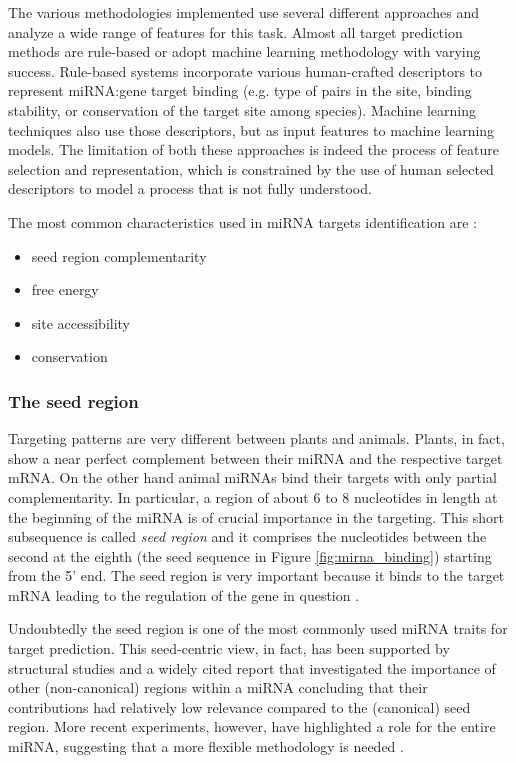 The various methodologies implemented use several different approaches and analyze a wide range of features for this task. Almost all target prediction methods are rule-based or adopt machine learning methodology with varying success. Rule-based systems incorporate various human-crafted descriptors to represent miRNA:gene target binding (e.g. type of pairs in the site, binding stability, or conservation of the target site among species). Machine learning techniques also use those descriptors, but as input features to machine learning models. The limitation of both these approaches is indeed the process of feature selection and representation, which is constrained by
the use of human selected descriptors to model a process that is not fully understood.

The most common characteristics used in miRNA targets identification are \cite{common_features}:
\begin{itemize}
	\item seed region complementarity
	\item free energy
	\item site accessibility
	\item conservation
\end{itemize}

\subsubsection{The seed region}
Targeting patterns are very different between plants and animals. Plants, in fact, show a near perfect complement between their miRNA and the respective target mRNA. On the other hand animal miRNAs bind their targets with only partial complementarity. In particular, a region of about 6 to 8 nucleotides in length at the beginning of the miRNA is of crucial importance in the targeting.  This short subsequence is called \emph{seed region} and it comprises the nucleotides between the second at the eighth (the seed sequence in Figure \ref{fig:mirna_binding}) starting from the 5' end. 
The seed region is very important because it binds to the target mRNA leading to the regulation of the gene in question \cite{mirna_overview}.

Undoubtedly the seed region is one of the most commonly used miRNA traits for target prediction. This seed-centric view, in fact,  has been supported by structural studies \cite{structural_basis} and a widely cited report  \cite{canonical_target} that investigated the importance of other (non-canonical) regions within a miRNA concluding that their contributions had relatively low relevance compared to the (canonical)
seed region. More recent experiments, however, have highlighted a role for the entire miRNA, suggesting that a more flexible methodology is needed \cite{helwak}.


